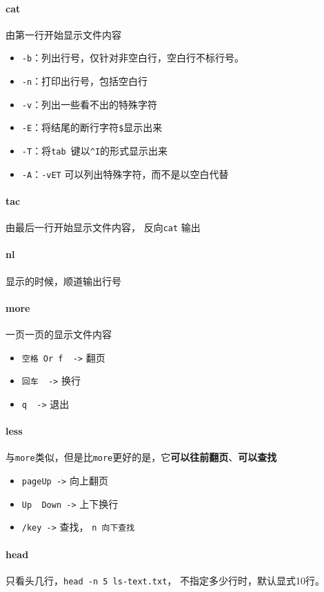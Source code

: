 \documentclass[UTF8,a4paper,12pt]{ctexbook}
\begin{document}
		\paragraph{cat} 由第一行开始显示文件内容
				\begin{itemize}[itemindent = 1em]
					\item \verb|-b|：列出行号，仅针对非空白行，空白行不标行号。
					\item \verb|-n|：打印出行号，包括空白行
					\item \verb|-v|：列出一些看不出的特殊字符
					\item \verb|-E|：将结尾的断行字符\verb|$|显示出来
					\item \verb|-T|：将\verb|tab |键以\verb|^I|的形式显示出来
					\item \verb|-A|：\verb|-vET| 可以列出特殊字符，而不是以空白代替
				\end{itemize}
		\paragraph{tac} 由最后一行开始显示文件内容， 反向\verb|cat| 输出
			
		\paragraph{nl} 显示的时候，顺道输出行号
		\paragraph{more} 一页一页的显示文件内容
			\begin{itemize}[itemindent = 1em]
				\item \verb|空格 Or f  ->| 翻页
				\item \verb|回车  ->| 换行
				\item \verb|q  ->| 退出
			\end{itemize}
		\paragraph{less} 与\verb|more|类似，但是比\verb|more|更好的是，它\textbf{可以往前翻页}、\textbf{可以查找}
			\begin{itemize}[itemindent = 1em]
				\item \verb|pageUp ->| 向上翻页
				\item \verb|Up  Down ->| 上下换行
				\item \verb|/key ->| 查找， \verb|n 向下查找|
			\end{itemize}
		\paragraph{head} 只看头几行，\verb|head -n 5 ls-text.txt|， 不指定多少行时，默认显式10行。
				
\end{document}
